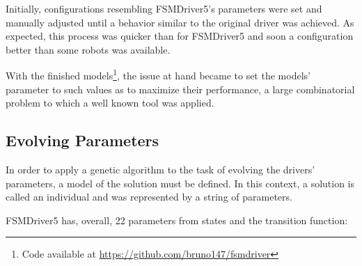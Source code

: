 Initially, configurations resembling FSMDriver5's parameters were set and manually adjusted until a behavior similar to the original driver was achieved. As expected, this process was quicker than for FSMDriver5 and soon a configuration better than some robots was available.

With the finished models\footnote{Code available at \url{https://github.com/bruno147/fsmdriver}}, the issue at hand became to set the models' parameter to such values as to maximize their performance, a large combinatorial problem to which a well known tool was applied.

\subsection{Evolving Parameters}%
In order to apply a genetic algorithm to the task of evolving the drivers' parameters, a model of the solution must be defined. In this context, a solution is called an individual and was represented by a string of parameters.

FSMDriver5 has, overall, 22 parameters from states and the transition function:

